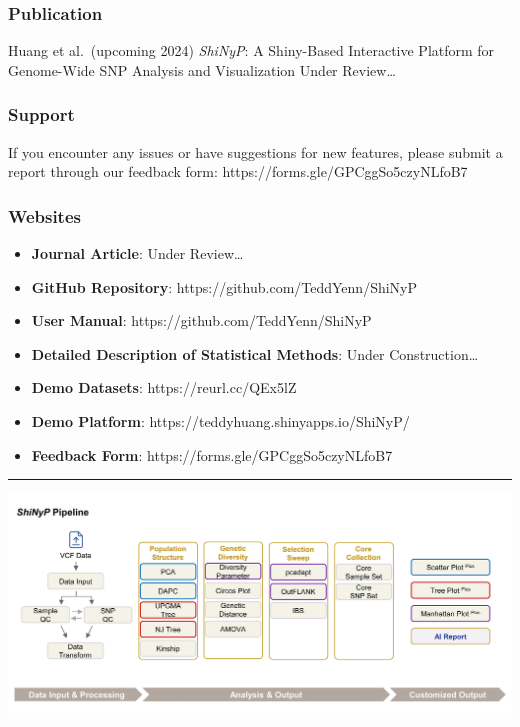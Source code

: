 \documentclass[
]{book}
\begin{document}
\subsubsection*{Publication}\label{publication}

Huang et al.~(upcoming 2024) \emph{ShiNyP}: A Shiny-Based Interactive Platform for Genome-Wide SNP Analysis and Visualization Under Review\ldots{}

\subsubsection*{Support}\label{support}

If you encounter any issues or have suggestions for new features, please submit a report through our feedback form: https://forms.gle/GPCggSo5czyNLfoB7

\subsubsection*{Websites}\label{websites}

\begin{itemize}
\item
  \textbf{Journal Article}: Under Review\ldots{}
\item
  \textbf{GitHub Repository}: https://github.com/TeddYenn/ShiNyP
\item
  \textbf{User Manual}: https://github.com/TeddYenn/ShiNyP
\item
  \textbf{Detailed Description of Statistical Methods}: Under Construction\ldots{}
\item
  \textbf{Demo Datasets}: https://reurl.cc/QEx5lZ
\item
  \textbf{Demo Platform}: https://teddyhuang.shinyapps.io/ShiNyP/
\item
  \textbf{Feedback Form}: https://forms.gle/GPCggSo5czyNLfoB7
\end{itemize}

\begin{center}\rule{0.5\linewidth}{0.5pt}\end{center}

\includegraphics{images/Fig. 1-02.jpg}
\end{document}
